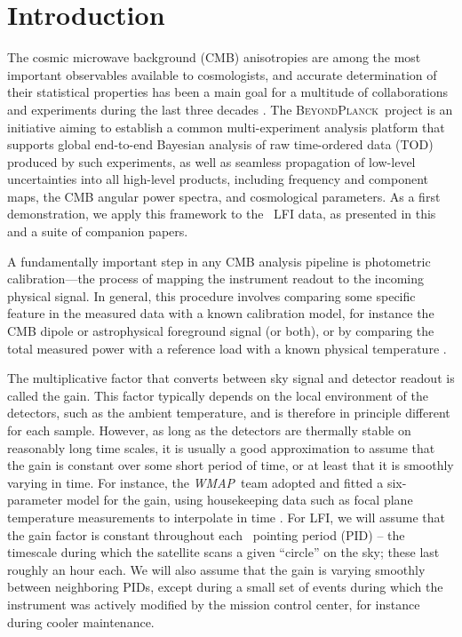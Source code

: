 \documentclass[twocolumn]{aa}
\def\WMAP{\textit{WMAP}}
\newcommand{\BP}{\textsc{BeyondPlanck}}
\newcommand{\lfi}[0]{LFI}
\begin{document}
\maketitle

\section{Introduction}
\label{sec:introduction}
The cosmic microwave background (CMB) anisotropies are among the most important observables available to cosmologists, and accurate determination of their statistical properties has been a main goal for a multitude of collaborations and experiments during the last three decades \citep[e.g.,][and references therein]{smoot:1992,debernardis:2000,kovac:2002,bennett2012,planck2016-l01}. The \BP\ project \citep{bp01} is an initiative aiming to establish a common multi-experiment analysis platform that supports global end-to-end Bayesian analysis of raw time-ordered data (TOD) produced by such experiments, as well as seamless propagation of low-level uncertainties into all high-level products, including frequency and component maps, the CMB angular power spectra, and cosmological parameters. As a first demonstration, we apply this framework to the \Planck\ LFI data, as presented in this and a suite of companion papers.

A fundamentally important step in any CMB analysis pipeline is photometric calibration---the process of mapping the instrument readout to the incoming physical signal. In general, this procedure involves comparing some specific feature in the measured data with a known calibration model, for instance the CMB dipole or astrophysical foreground signal (or both), or by comparing the total measured power with a reference load with a known physical temperature \citep[e.g.,][]{planck2014-a06}. 

The multiplicative factor that converts between sky signal and detector readout is called the gain. This factor typically depends on the local environment of the detectors, such as the ambient temperature, and is therefore  in principle different for each sample. However, as long as the detectors are thermally stable on reasonably long time scales, it is usually a good approximation to assume that the gain is constant over some short period of time, or at least that it is smoothly varying in time. For instance, the \WMAP\ team adopted and fitted a six-parameter model for the gain, using housekeeping data such as focal plane temperature measurements to interpolate in time \citep{jarosik2007, Hinshaw_2009, wmapexsupp}. For \lfi, we will assume that the gain factor is constant throughout each \Planck\ pointing period (PID) -- the timescale during which the satellite scans a given ``circle'' on the sky; these last roughly an hour each. We will also assume that the gain is varying smoothly between neighboring PIDs, except during a small set of events during which the instrument was actively modified by the mission control center, for instance during cooler maintenance. 
\end{document}
